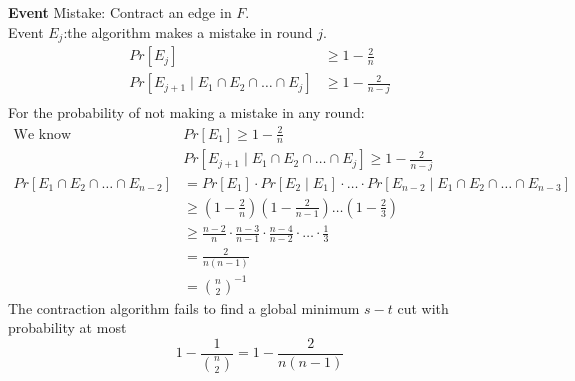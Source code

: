 \documentclass[onecolumn]{report}
\begin{document}
\textbf{Event}
Mistake: Contract an edge in $F$.\\
Event $E_j$:the algorithm makes a mistake in round $j$.\\
\begin{align*}
    Pr[E_j]& \geq 1-\frac{2}{n}\\
    Pr[E_{j+1}\mid E_1 \cap E_2 \cap \dots \cap E_j]& \geq 1-\frac{2}{n-j}\\
\end{align*}
For the probability of not making a mistake in any round:
\begin{align*}
    \text{We know  } & Pr[E_1] \geq 1-\frac{2}{n}\\
    &Pr[E_{j+1}\mid E_1 \cap E_2 \cap \dots \cap E_j] \geq 1-\frac{2}{n-j}\\
    Pr[E_1 \cap E_2 \cap \dots \cap E_{n-2}] &= Pr[E_1] \cdot Pr[E_2 \mid E_1] \cdot \dots \cdot Pr[E_{n-2} \mid E_1 \cap E_2 \cap \dots \cap E_{n-3}]\\
    &\geq (1-\frac{2}{n})(1-\frac{2}{n-1})\dots(1-\frac{2}{3})\\
    &\geq \frac{n-2}{n} \cdot \frac{n-3}{n-1} \cdot \frac{n-4}{n-2} \cdot \dots \cdot \frac{1}{3}\\
    &= \frac{2}{n(n-1)}\\
    &= \binom{n}{2}^{-1}
\end{align*}
The contraction algorithm fails to find a global minimum $s-t$ cut with probability at most
\begin{equation*}
    1-\frac{1}{\binom{n}{2}} = 1-\frac{2}{n(n-1)}
\end{equation*}
\end{document}
